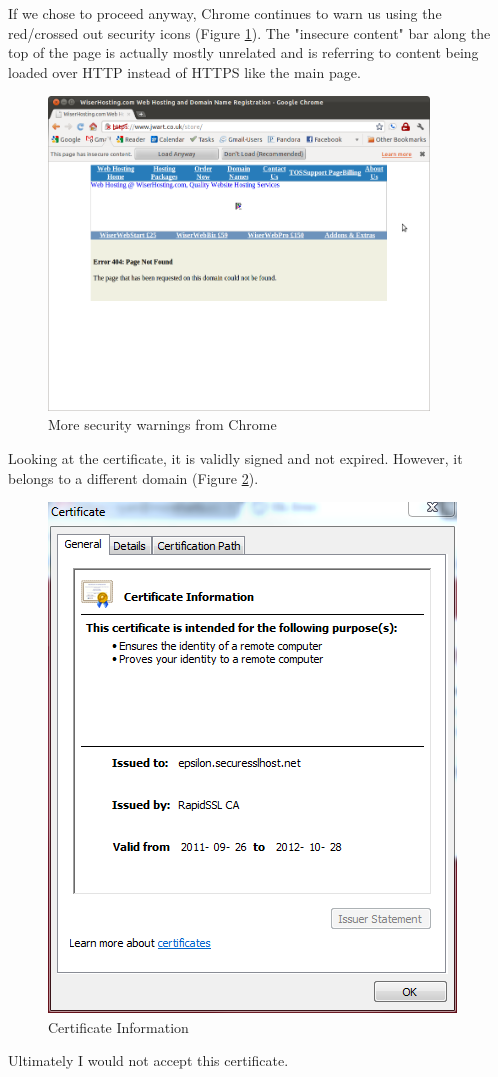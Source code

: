 \documentclass{article}
\begin{document}
\par If we chose to proceed anyway, Chrome continues to warn us using the red/crossed out security icons (Figure \ref{fig:morewarnings}). The "insecure content" bar along the top of the page is actually mostly unrelated and is referring to content being loaded over HTTP instead of HTTPS like the main page.

\begin{figure}[h]
\centering
\includegraphics[width=0.9\textwidth, trim=0pt 300pt 200pt 50pt, clip]{insecure}
\caption{More security warnings from Chrome}
\label{fig:morewarnings}
\end{figure}

\par Looking at the certificate, it is validly signed and not expired. However, it belongs to a different domain (Figure \ref{fig:cert}).

\begin{figure}[h]
\centering
\includegraphics{cert}
\caption{Certificate Information}
\label{fig:cert}
\end{figure}

\par Ultimately I would not accept this certificate.
\end{document}
